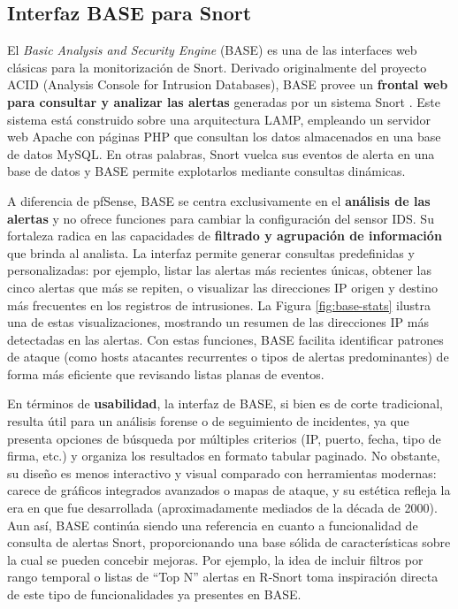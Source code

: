 \documentclass[11pt,a4paper,twoside]{report}
\begin{document}
\subsection{Interfaz BASE para Snort}
El \emph{Basic Analysis and Security Engine} (BASE) es una de las interfaces web clásicas para la monitorización de Snort. Derivado originalmente del proyecto ACID (Analysis Console for Intrusion Databases), BASE provee un \textbf{frontal web para consultar y analizar las alertas} generadas por un sistema Snort \cite{base}. Este sistema está construido sobre una arquitectura LAMP, empleando un servidor web Apache con páginas PHP que consultan los datos almacenados en una base de datos MySQL. En otras palabras, Snort vuelca sus eventos de alerta en una base de datos y BASE permite explotarlos mediante consultas dinámicas.\newline

A diferencia de pfSense, BASE se centra exclusivamente en el \textbf{análisis de las alertas} y no ofrece funciones para cambiar la configuración del sensor IDS. Su fortaleza radica en las capacidades de 
\textbf{filtrado y agrupación de información} que brinda al analista. La interfaz permite generar consultas predefinidas y personalizadas: por ejemplo, listar las alertas más recientes únicas, obtener las cinco alertas que más se repiten, o visualizar las direcciones IP origen y destino más frecuentes en los registros de intrusiones. La Figura \ref{fig:base-stats} ilustra una de estas visualizaciones, mostrando un resumen de las direcciones IP más detectadas en las alertas. Con estas funciones, BASE facilita identificar patrones de ataque (como hosts atacantes recurrentes o tipos de alertas predominantes) de forma más eficiente que revisando listas planas de eventos.\newline

En términos de \textbf{usabilidad}, la interfaz de BASE, si bien es de corte tradicional, resulta útil para un análisis forense o de seguimiento de incidentes, ya que presenta opciones de búsqueda por múltiples criterios (IP, puerto, fecha, tipo de firma, etc.) y organiza los resultados en formato tabular paginado. No obstante, su diseño es menos interactivo y visual comparado con herramientas modernas: carece de gráficos integrados avanzados o mapas de ataque, y su estética refleja la era en que fue desarrollada (aproximadamente mediados de la década de 2000). Aun así, BASE continúa siendo una referencia en cuanto a funcionalidad de consulta de alertas Snort, proporcionando una base sólida de características sobre la cual se pueden concebir mejoras. Por ejemplo, la idea de incluir filtros por rango temporal o listas de “Top N” alertas en R-Snort toma inspiración directa de este tipo de funcionalidades ya presentes en BASE.
\end{document}

